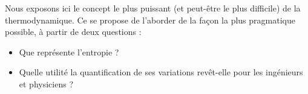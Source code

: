 Nous exposons ici le concept le plus puissant (et peut-être le plus difficile) de la thermodynamique. Ce \courshuit se propose de l’aborder de la façon la plus pragmatique possible, à partir de deux questions :
\begin{itemize}
	\item Que représente l’entropie ?
	\item Quelle utilité la quantification de ses variations revêt-elle pour les ingénieurs et physiciens ?
\end{itemize}
